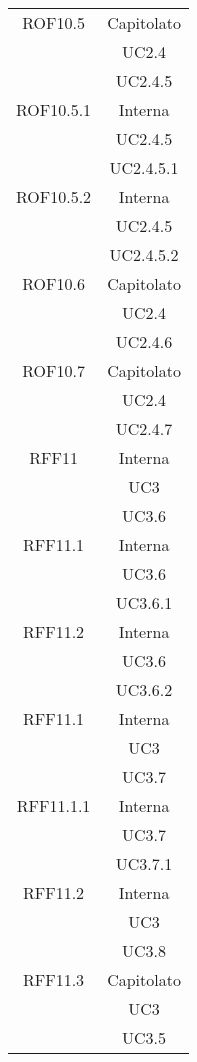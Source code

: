 \begin{longtable}{|c|c|}
\midrule
ROF10.5
& Capitolato\\
& UC2.4\\
& UC2.4.5
\\

\midrule
ROF10.5.1
& Interna\\
& UC2.4.5\\
& UC2.4.5.1
\\

\midrule
ROF10.5.2
& Interna\\
& UC2.4.5\\
& UC2.4.5.2
\\

\midrule
ROF10.6
& Capitolato\\
& UC2.4\\
& UC2.4.6
\\

\midrule
ROF10.7
& Capitolato\\
& UC2.4\\
& UC2.4.7
\\



\midrule
RFF11
& Interna\\
& UC3\\
& UC3.6\\

\midrule
RFF11.1
& Interna\\
& UC3.6\\
& UC3.6.1\\

\midrule
RFF11.2
& Interna\\
& UC3.6\\
& UC3.6.2\\

\midrule
RFF11.1
& Interna\\
& UC3\\
& UC3.7\\

\midrule
RFF11.1.1
& Interna\\
& UC3.7\\
& UC3.7.1\\

\midrule
RFF11.2
& Interna\\
& UC3\\
& UC3.8\\

\midrule
RFF11.3
& Capitolato\\
& UC3\\
& UC3.5\\


\end{longtable}
